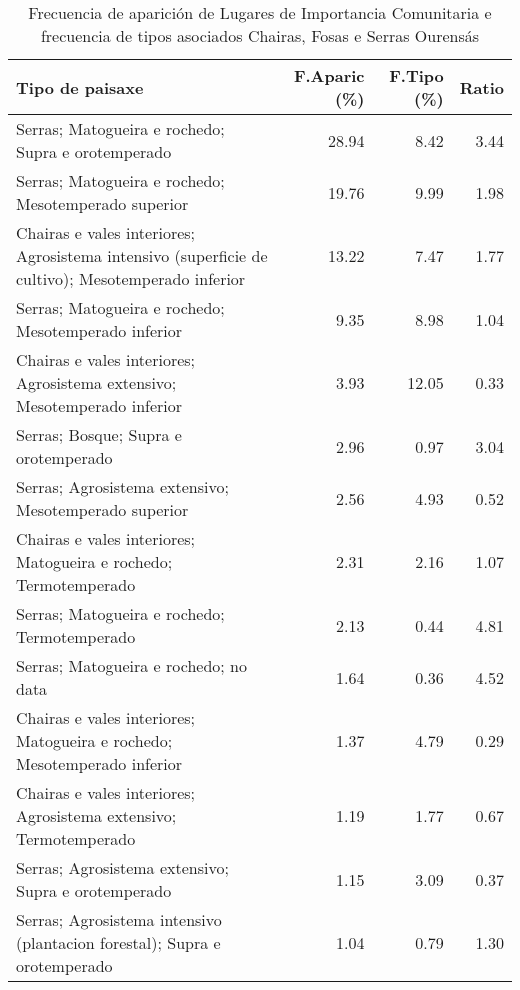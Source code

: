 \begin{table}[p]
\centering
\caption{Frecuencia de aparición de Lugares de Importancia Comunitaria e frecuencia de tipos asociados Chairas, Fosas e Serras Ourensás} 
\label{vnatura8}
\begin{tabular}{lrrr}
  \hline
Tipo de paisaxe & F.Aparic (\%) & F.Tipo (\%) & Ratio \\ 
  \hline
Serras; Matogueira e rochedo; Supra e orotemperado & 28.94 & 8.42 & 3.44 \\ 
  Serras; Matogueira e rochedo; Mesotemperado superior & 19.76 & 9.99 & 1.98 \\ 
  Chairas e vales interiores; Agrosistema intensivo (superficie de cultivo); Mesotemperado inferior & 13.22 & 7.47 & 1.77 \\ 
  Serras; Matogueira e rochedo; Mesotemperado inferior & 9.35 & 8.98 & 1.04 \\ 
  Chairas e vales interiores; Agrosistema extensivo; Mesotemperado inferior & 3.93 & 12.05 & 0.33 \\ 
  Serras; Bosque; Supra e orotemperado & 2.96 & 0.97 & 3.04 \\ 
  Serras; Agrosistema extensivo; Mesotemperado superior & 2.56 & 4.93 & 0.52 \\ 
  Chairas e vales interiores; Matogueira e rochedo; Termotemperado & 2.31 & 2.16 & 1.07 \\ 
  Serras; Matogueira e rochedo; Termotemperado & 2.13 & 0.44 & 4.81 \\ 
  Serras; Matogueira e rochedo; no data & 1.64 & 0.36 & 4.52 \\ 
  Chairas e vales interiores; Matogueira e rochedo; Mesotemperado inferior & 1.37 & 4.79 & 0.29 \\ 
  Chairas e vales interiores; Agrosistema extensivo; Termotemperado & 1.19 & 1.77 & 0.67 \\ 
  Serras; Agrosistema extensivo; Supra e orotemperado & 1.15 & 3.09 & 0.37 \\ 
  Serras; Agrosistema intensivo (plantacion forestal); Supra e orotemperado & 1.04 & 0.79 & 1.30 \\ 
   \hline
\end{tabular}
\end{table}
